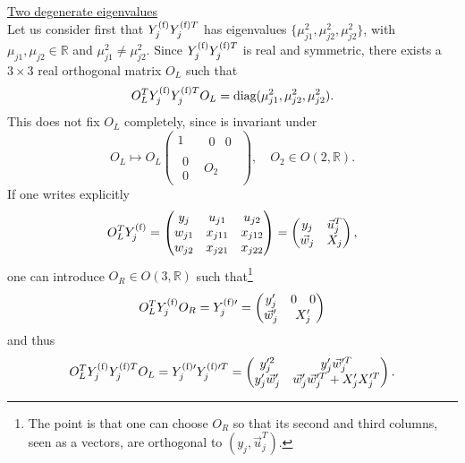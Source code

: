 \documentclass[12pt,a4paper]{article}
\begin{document}
\underline{Two degenerate eigenvalues}\\
Let us consider first that $Y_{j}^{\rm (f)}Y_{j}^{{\rm (f)}T}$ has eigenvalues $\{\mu_{j1}^2,\mu_{j2}^2,\mu_{j2}^2\}$, with $\mu_{j1},\mu_{j2}\in\mathbb{R}$ and $\mu_{j1}^2\neq\mu_{j2}^2$. Since $Y_{j}^{\rm (f)}Y_{j}^{{\rm (f)}T}$ is real and symmetric, there exists a $3\times 3$ real orthogonal matrix $O_L$ such that 
\begin{equation}\label{eq:2degenerate:00}
 O_L^TY_{j}^{\rm (f)}Y_{j}^{{\rm (f)}T}O_L=\text{diag}(\mu_{j1}^2,\mu_{j2}^2,\mu_{j2}^2).
\end{equation}
This does not fix $O_L$ completely, since  is invariant under
\begin{equation}
 O_L\mapsto O_L \begin{pmatrix}1 & \begin{matrix}0&0\end{matrix}\\ \begin{matrix}0\\ 0\end{matrix} & O_2\end{pmatrix},\quad O_2\in O(2,\mathbb{R}).
\end{equation}
If one writes explicitly
\begin{equation}
 O_L^TY_{j}^{\rm (f)}=\begin{pmatrix}y_j&u_{j1}&u_{j2}\\ w_{j1}& x_{j11} & x_{j12}\\ w_{j2}& x_{j21}&x_{j22}\end{pmatrix}=\begin{pmatrix}y_j&\vec u_j^T\\ \vec w_j& X_j\end{pmatrix},
\end{equation}
one can introduce $O_R\in O(3,\mathbb{R})$ such that\footnote{The point is that one can choose $O_R$ so that its second and third columns, seen as a vectors, are orthogonal to $(y_j,\vec u_j^{T})$.} 
\begin{equation}
 O_L^TY_{j}^{\rm (f)}O_R=Y_{j}^{\rm (f)\prime}=\begin{pmatrix}y_j^\prime&\begin{matrix}0& 0\end{matrix}\\\vec w_j^\prime & X_j^\prime\end{pmatrix}
\end{equation}
and thus
\begin{equation}\label{eq:2degenerate:01}
 O_L^TY_{j}^{\rm (f)}Y_{j}^{{\rm (f)}T}O_L=Y_{j}^{\rm (f)\prime}Y_{j}^{{\rm (f)\prime}T}=\begin{pmatrix}y_j^{\prime 2}&y_j^\prime\vec w_j^{\prime T}\\ y_j^\prime\vec w_j^{\prime} & \vec w_j^{\prime}\vec w_j^{\prime T}+X_j^\prime X_j^{\prime T}\end{pmatrix}.
\end{equation}
\end{document}
